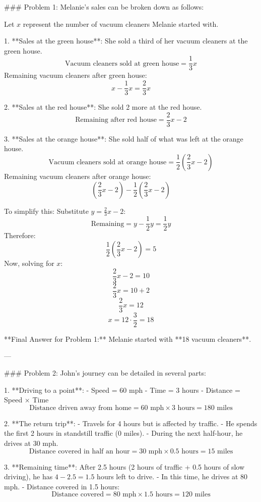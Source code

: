 \documentclass[11pt,addpoints,answers]{exam}
\begin{document}
\begin{questions}
\begin{tcolorbox}[fit,height=22cm, width=16cm, blank, borderline={1pt}{-2pt},nobeforeafter,breakable]
### Problem 1:
Melanie's sales can be broken down as follows:

Let \( x \) represent the number of vacuum cleaners Melanie started with.

1. **Sales at the green house**: She sold a third of her vacuum cleaners at the green house.
   \[
   \text{Vacuum cleaners sold at green house} = \frac{1}{3}x
   \]
   Remaining vacuum cleaners after green house:
   \[
   x - \frac{1}{3}x = \frac{2}{3}x
   \]

2. **Sales at the red house**: She sold 2 more at the red house.
   \[
   \text{Remaining after red house} = \frac{2}{3}x - 2
   \]

3. **Sales at the orange house**: She sold half of what was left at the orange house.
   \[
   \text{Vacuum cleaners sold at orange house} = \frac{1}{2}\left(\frac{2}{3}x - 2\right)
   \]
   Remaining vacuum cleaners after orange house:
   \[
   \left(\frac{2}{3}x - 2\right) - \frac{1}{2}\left(\frac{2}{3}x - 2\right)
   \]

   To simplify this:
   Substitute \( y = \frac{2}{3}x - 2 \):
   \[
   \text{Remaining} = y - \frac{1}{2}y = \frac{1}{2}y
   \]
   Therefore:
   \[
   \frac{1}{2}\left(\frac{2}{3}x - 2\right) = 5
   \]
   Now, solving for \( x \):
   \[
   \frac{2}{3}x - 2 = 10
   \]
   \[
   \frac{2}{3}x = 10 + 2
   \]
   \[
   \frac{2}{3}x = 12
   \]
   \[
   x = 12 \cdot \frac{3}{2} = 18
   \]

**Final Answer for Problem 1:**
Melanie started with **18 vacuum cleaners**.

---

### Problem 2:
John's journey can be detailed in several parts:

1. **Driving to a point**: 
   - Speed = 60 mph
   - Time = 3 hours
   - Distance = Speed × Time
   \[
   \text{Distance driven away from home} = 60 \text{ mph} \times 3 \text{ hours} = 180 \text{ miles}
   \]

2. **The return trip**: 
   - Travels for 4 hours but is affected by traffic.
   - He spends the first 2 hours in standstill traffic (0 miles).
   - During the next half-hour, he drives at 30 mph.
   \[
   \text{Distance covered in half an hour} = 30 \text{ mph} \times 0.5 \text{ hours} = 15 \text{ miles}
   \]

3. **Remaining time**: After 2.5 hours (2 hours of traffic + 0.5 hours of slow driving), he has \( 4 - 2.5 = 1.5 \) hours left to drive.
   - In this time, he drives at 80 mph.
   - Distance covered in 1.5 hours:
   \[
   \text{Distance covered} = 80 \text{ mph} \times 1.5 \text{ hours} = 120 \text{ miles}
   \]


\end{tcolorbox}
\end{questions}
\end{document}
